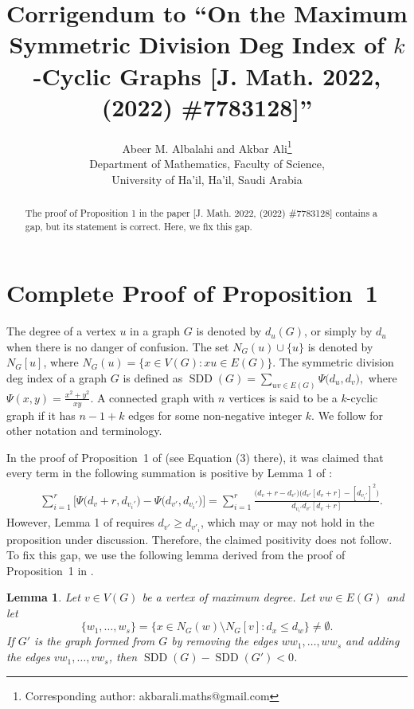 \documentclass[10pt]{article}
\title{Corrigendum to ``On the Maximum Symmetric Division Deg Index of
$k$-Cyclic Graphs [J. Math. 2022, (2022) \#7783128]''}
\author{Abeer M. Albalahi and Akbar Ali\footnote{Corresponding author: akbarali.maths@gmail.com}\\[2mm]
Department of Mathematics, Faculty of Science,\\ University of Ha\!'il, Ha\!'il, Saudi Arabia}
\date{}
\newtheorem{lemma}[theorem]{Lemma}
\newcommand{\SDD}{\operatorname{SDD}}
\begin{document}
\maketitle

\begin{abstract}
The proof of Proposition 1 in the paper [J. Math. 2022, (2022) \#7783128] contains a gap, but its statement is correct. Here, we fix this gap.

\end{abstract}



\section{Complete Proof of Proposition~1}

 The degree
of a vertex $u$ in a graph $G$ is denoted by $d_u(G)$, or simply by $d_u$ when there is no
danger of confusion.
The set $N_G(u)\cup \{u\}$ is denoted by $N_G[u]$, where $N_G(u)= \{x\in V(G):xu\in E(G)\}$. The symmetric division
deg index of a graph $G$ is defined as
$\SDD(G)=\sum_{uv\in E(G)}\Psi\bigl(d_u,d_v\big),$
where $\Psi(x,y)=\frac{x^2+y^2}{xy}$.
A connected graph with $n$ vertices is said to be a
$k$-cyclic graph if it has $n-1+k$ edges for some non-negative integer $k$. We follow \cite{AlbalahiAli2022} for other notation and terminology.

In the proof of Proposition~1 of \cite{AlbalahiAli2022} (see Equation (3) there), it was claimed that every term in the following summation is positive by Lemma 1 of \cite{AlbalahiAli2022}:
\begin{align*}
&\sum_{i=1}^r\big[\Psi\bigl(d_v+r,d_{v_i'}\big)
-\Psi\bigl(d_{v'},d_{v_i'}\big)\big]=\sum_{i=1}^r
\frac{\bigl(d_v+r-d_{v'}\big)
\bigl(d_{v'}[d_v+r]-[d_{v_i'}]^2\big)}
{d_{v_i'}d_{v'}[d_v+r]}.
\end{align*}
However, Lemma 1 of \cite{AlbalahiAli2022} requires $d_{v'}\ge d_{v'_i}$, which may or may not hold in the proposition under discussion.  Therefore, the claimed positivity
does not follow. To fix this gap, we use the following lemma derived from the proof of Proposition~1 in \cite{AlbalahiAli2022}.

\begin{lemma}\label{lem:transfer}
Let $v\in V(G)$ be a vertex of maximum degree. Let $vw\in E(G)$ and let
\[
\{w_1,\ldots,w_s\}
=\{x\in N_G(w)\setminus N_G[v]:d_x\le d_w\}\ne\emptyset.
\]
If $G'$ is the graph formed from $G$ by removing the edges $ww_1,\ldots,ww_s$ and adding the edges $vw_1,\ldots,vw_s$,
then $\SDD(G)-\SDD(G')<0$.
\end{lemma}
\end{document}
